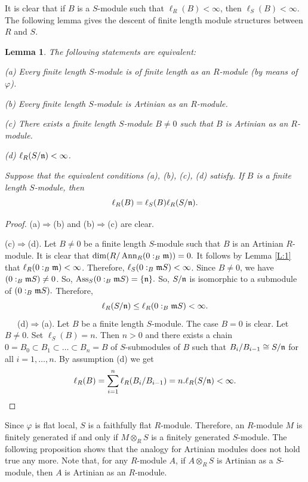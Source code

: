 \documentclass[a4papersize]{article}
\newtheorem{lemma}[theorem]{Lemma}
\DeclareMathOperator{\Ann}{Ann}
\DeclareMathOperator{\Ass}{Ass}
\begin{document}
  It is clear that if $B$ is a $S$-module such that $\ell_R(B)<\infty$, then $\ell_S(B)<\infty$.  The following lemma gives the descent of finite length module structures between $R$ and $S$. 

\begin{lemma} \label{L:1a} The following statements are equivalent:

(a)  Every  finite length $S$-module is of finite length as an $R$-module (by means of $\varphi$).

(b) Every  finite length $S$-module is Artinian as an $R$-module.

(c) There exists a finite length $S$-module $B\neq 0$  such that $B$ is Artinian as an $R$-module.

(d) $\ell_R (S/\frak n)<\infty$.


Suppose that the equivalent conditions (a), (b), (c), (d) satisfy. If $B$ is a finite length $S$-module, then 
$$\ell_R(B)=\ell_S(B)\ell_R(S/\frak n).$$
\end{lemma}

\begin{proof} (a)$\Rightarrow$(b) and (b)$\Rightarrow$(c) are clear.

 (c)$\Rightarrow$(d).  Let $B\neq 0$ be a finite length $S$-module such that $B$ is an Artinian $R$-module. It is clear that $\dim (R/\Ann_R(0:_B\frak m))=0.$ It follows by Lemma \ref{L:1} that $\ell_R(0:_B\frak m)<\infty$. Therefore,  $\ell_S(0:_B\frak mS)<\infty$. Since $B\neq 0$, we have $(0:_B\frak mS)\neq 0$. So, $\Ass_S(0:_B\frak mS)=\{\frak n\}.$  So, $S/\frak n$ is isomorphic to a submodule of $(0:_B\frak mS).$ Therefore, $$\ell_R(S/\frak n)\leq \ell_R(0:_B\frak mS)<\infty.$$ 
\ \ \ (d)$\Rightarrow$(a).  Let $B$ be a finite length $S$-module.  The case $B=0$ is clear. Let  $B\neq 0$. Set  $\ell_S(B)=n.$ Then $n>0$  and there exists a chain $0=B_0\subset B_1\subset \ldots \subset B_n=B$ of $S$-submodules of $B$ such that  $B_i/B_{i-1}\cong S/\frak n$ for all $i=1, \ldots, n.$ By assumption (d) we get
$$\ell_R(B)=\sum_{i=1}^n \ell_R(B_i/B_{i-1})=n.\ell_R(S/\frak n)<\infty.$$
\end{proof}   

Since $\varphi$ is flat local, $S$ is a  faithfully flat $R$-module. Therefore, an $R$-module $M$ is finitely generated if and only if $M\otimes_RS$ is a finitely generated $S$-module.  The following proposition shows that the analogy for Artinian modules does not hold true any more.  Note that, for any $R$-module $A$, if $A\otimes_RS$ is  Artinian as a $S$-module, then $A$ is  Artinian as an $R$-module.  
\end{document}
